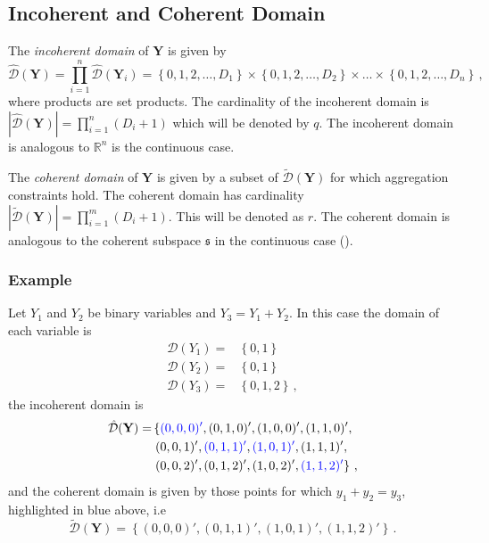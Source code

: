 \documentclass[a4paper,review,12pt,authoryear]{elsarticle}
\newcommand{\bY}{\mathbf{Y}}
\begin{document}
	\subsection{Incoherent and Coherent Domain}
	The \textit{incoherent domain} of $\bY$ is given by
	\[
	\hat{\mathcal D}(\bY)=\prod\limits_{i=1}^n\hat{\mathcal D}(\bY_i)=\left\{0, 1,2,\dots,D_1\right\}\times\left\{0,1,2,\dots,D_2\right\}\times\dots\times\left\{0,1,2,\dots,D_n\right\}\,,
	\] 
  where products are set products. The cardinality of the incoherent domain is $|\hat{\mathcal D}(\bY)|=\prod\limits_{i=1}^{n} (D_i+1)$ which will be denoted by $q$. 
  The incoherent domain is analogous to $\mathbb{R}^n$ is the continuous case.
    
  The \textit{coherent domain} of $\bY$ is given by a subset of $\tilde{\mathcal D}(\bY)$ for which aggregation constraints hold.  
  The coherent domain has cardinality $|\tilde{\mathcal D}(\bY)|=\prod\limits_{i=1}^{m} (D_i+1)$. This will be denoted as $r$. 
  The coherent domain is analogous to the coherent subspace $\mathfrak{s}$ in the continuous case (\citealp{panagiotelisProbabilisticForecastReconciliation2022}).
    
    \subsubsection*{Example}
    
    Let $Y_1$ and $Y_2$ be binary variables and $Y_3=Y_1+Y_2$. In this case the domain of each variable is
    \begin{align*}
      \mathcal{D}(Y_1)=&\left\{0,1\right\}\\
      \mathcal{D}(Y_2)=&\left\{0,1\right\}\\
      \mathcal{D}(Y_3)=&\left\{0,1,2\right\}\,,
    \end{align*}	
    the incoherent domain is
    \begin{align*}
    \hat{\mathcal D}(\bY)=&\left\{\textcolor{blue}{(0,0,0)'},(0,1,0)',(1,0,0)',(1,1,0)',\right.\\
    &\left.(0,0,1)',\textcolor{blue}{(0,1,1)'},\textcolor{blue}{(1,0,1)'},(1,1,1)',\right.\\
    &\left.(0,0,2)',(0,1,2)',(1,0,2)',\textcolor{blue}{(1,1,2)'}\right\}\,,
    \end{align*}
    and the coherent domain is given by those points for which $y_1+y_2=y_3$, highlighted in blue above, i.e
    \[
        \tilde{\mathcal D}(\bY)=\left\{(0,0,0)',(0,1,1)',(1,0,1)',(1,1,2)'\right\}\,.
    \]
    
\end{document}
